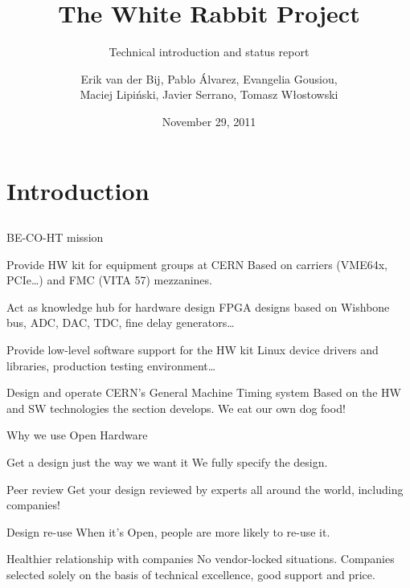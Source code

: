 \documentclass[compress,red]{beamer}
\title[WR Project Status\hspace{2em}\insertframenumber/
\inserttotalframenumber]{The White Rabbit Project}
\subtitle{Technical introduction and status report}
\author{Erik van der Bij, Pablo \'A{}lvarez, Evangelia Gousiou,\\Maciej
  Lipi\'{n}ski, Javier Serrano, Tomasz W\l{}ostowski}
\date{November 29, 2011}
\institute%
{
  BE-CO Hardware and Timing section\\
  CERN, Geneva, Switzerland
 }
\begin{document}
\frame{\titlepage}


\section{Introduction}

\subsection{}

\begin{frame}{BE-CO-HT mission}
\begin{block}{Provide HW kit for equipment groups at CERN}
Based on carriers (VME64x, PCIe\ldots) and FMC (VITA 57) mezzanines.
\end{block}
\begin{block}{Act as knowledge hub for hardware design}
FPGA designs based on Wishbone bus, ADC, DAC, TDC, fine delay generators\ldots
\end{block}
\begin{block}{Provide low-level software support for the HW kit}
Linux device drivers and libraries, production testing environment\ldots
\end{block}
\begin{block}{Design and operate CERN's General Machine
    Timing system}
Based on the HW and SW technologies the section develops. We eat our
own dog food!
\end{block}
\end{frame}

\begin{frame}{Why we use Open Hardware}
\begin{block}{Get a design just the way we want it}
We fully specify the design.
\end{block}
\begin{block}{Peer review}
Get your design reviewed by experts all around the world, including companies!
\end{block}
\begin{block}{Design re-use}
When it's Open, people are more likely to re-use it.
\end{block}
\begin{block}{Healthier relationship with companies}
No vendor-locked situations. Companies selected solely on the basis of
technical excellence, good support and price.
\end{block}
\end{frame}
\end{document}
